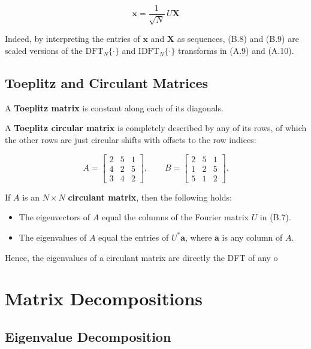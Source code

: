 \begin{equation}
\mathbf{x} = \frac{1}{\sqrt{N}} \, U \mathbf{X}
\tag{B.9}
\end{equation}

Indeed, by interpreting the entries of $\mathbf{x}$ and $\mathbf{X}$ as sequences, (B.8) and (B.9) are scaled versions of the $\text{DFT}_N\{\cdot\}$ and $\text{IDFT}_N\{\cdot\}$ transforms in (A.9) and (A.10).

\subsection{Toeplitz and Circulant Matrices}

A \textbf{Toeplitz matrix} is constant along each of its diagonals.

A \textbf{Toeplitz circular matrix} is completely described by any of its rows,  
of which the other rows are just circular shifts with offsets to the row indices:

\begin{equation}
A =
\begin{bmatrix}
2 & 5 & 1 \\
4 & 2 & 5 \\
3 & 4 & 2
\end{bmatrix}
,\qquad
B =
\begin{bmatrix}
2 & 5 & 1 \\
1 & 2 & 5 \\
5 & 1 & 2
\end{bmatrix}.
\tag{B.10}
\end{equation}

If $A$ is an $N \times N$ \textbf{circulant matrix}, then the following holds:

\begin{itemize}
    \item The eigenvectors of $A$ equal the columns of the Fourier matrix $U$ in (B.7).
    \item The eigenvalues of $A$ equal the entries of $U^* \mathbf{a}$, where $\mathbf{a}$ is any column of $A$.
\end{itemize}

Hence, the eigenvalues of a circulant matrix are directly the DFT of any o

\section{Matrix Decompositions}
\subsection{Eigenvalue Decomposition}

